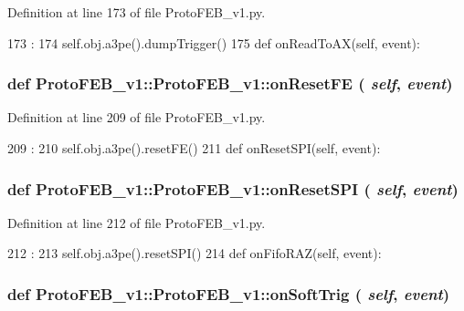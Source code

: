 Definition at line 173 of file ProtoFEB\_\-v1.py.


\begin{DoxyCode}
173                                   :
174         self.obj.a3pe().dumpTrigger()
175 
    def onReadToAX(self, event):
\end{DoxyCode}
\hypertarget{classProtoFEB__v1_1_1ProtoFEB__v1_a9bf15b7b386345b1be7005a6ac8e171b}{
\subsubsection[{onResetFE}]{\setlength{\rightskip}{0pt plus 5cm}def ProtoFEB\_\-v1::ProtoFEB\_\-v1::onResetFE ( {\em self}, \/   {\em event})}}
\label{classProtoFEB__v1_1_1ProtoFEB__v1_a9bf15b7b386345b1be7005a6ac8e171b}


Definition at line 209 of file ProtoFEB\_\-v1.py.


\begin{DoxyCode}
209                               :
210         self.obj.a3pe().resetFE()
211 
    def onResetSPI(self, event):
\end{DoxyCode}
\hypertarget{classProtoFEB__v1_1_1ProtoFEB__v1_ae61b7e9e534bf9690ecea4e72cfb1eb8}{
\subsubsection[{onResetSPI}]{\setlength{\rightskip}{0pt plus 5cm}def ProtoFEB\_\-v1::ProtoFEB\_\-v1::onResetSPI ( {\em self}, \/   {\em event})}}
\label{classProtoFEB__v1_1_1ProtoFEB__v1_ae61b7e9e534bf9690ecea4e72cfb1eb8}


Definition at line 212 of file ProtoFEB\_\-v1.py.


\begin{DoxyCode}
212                                :
213         self.obj.a3pe().resetSPI()
214 
    def onFifoRAZ(self, event):
\end{DoxyCode}
\hypertarget{classProtoFEB__v1_1_1ProtoFEB__v1_aeacb09d0b459c2fb2aa662358c29ef27}{
\subsubsection[{onSoftTrig}]{\setlength{\rightskip}{0pt plus 5cm}def ProtoFEB\_\-v1::ProtoFEB\_\-v1::onSoftTrig ( {\em self}, \/   {\em event})}}
\label{classProtoFEB__v1_1_1ProtoFEB__v1_aeacb09d0b459c2fb2aa662358c29ef27}


